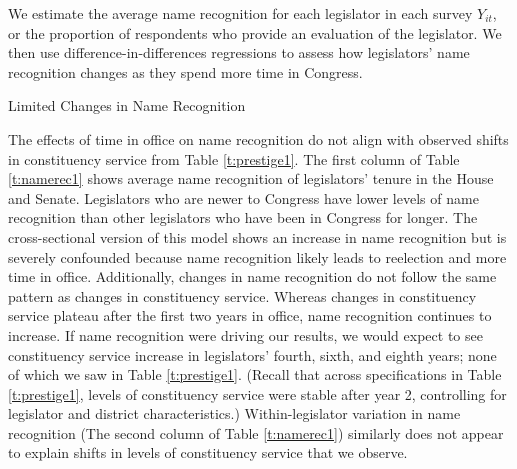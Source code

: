 We estimate the average name recognition for each legislator in each survey $Y_{it}$, or the proportion of respondents who provide an evaluation of the legislator. We then use difference-in-differences regressions to assess how legislators' name recognition changes as they spend more time in Congress.  

\begin{table}[hbt!]
\caption{Limited Changes in Name Recognition} \label{t:namerec1}

\begin{minipage}{\textwidth}
\begin{center}

\end{center}
\end{minipage}
\end{table}

The effects of time in office on name recognition do not align with observed shifts in constituency service from Table \ref{t:prestige1}.
The first column of Table \ref{t:namerec1} shows average name recognition of legislators' tenure in the House and Senate. Legislators who are newer to Congress have lower levels of name recognition than other legislators who have been in Congress for longer. The cross-sectional version of this model shows an increase in name recognition but is severely confounded because name recognition likely leads to reelection and more time in office. Additionally, changes in name recognition do not follow the same pattern as changes in constituency service. Whereas changes in constituency service plateau after the first two years in office, name recognition continues to increase. If name recognition were driving our results, we would expect to see constituency service increase in legislators' fourth, sixth, and eighth years; none of which we saw in Table \ref{t:prestige1}. (Recall that across specifications in Table \ref{t:prestige1}, levels of constituency service were stable after year 2, controlling for legislator and district characteristics.) Within-legislator variation in name recognition (The second column of Table \ref{t:namerec1}) similarly does not appear to explain shifts in levels of constituency service that we observe.


